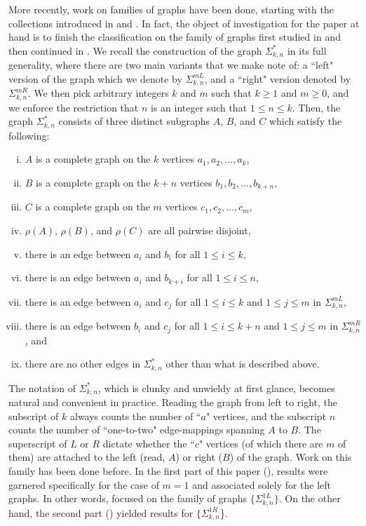 \documentclass[11pt]{amsart}
\theoremstyle{definition}
\theoremstyle{remark}
\numberwithin{equation}{section}
\newcommand{\SLR}[2]{\Sigma_{#1,#2}^*} %
\newcommand{\SLi}[3]{\Sigma_{#1,#2}^{#3L}} %
\newcommand{\SRi}[3]{\Sigma_{#1,#2}^{#3R}} %
\begin{document}
More recently, work on families of graphs have been done, starting with the collections introduced in \cite{BL} and \cite{BLL2}. In fact, the object of investigation for the paper at hand is to finish the classification on the family of graphs first studied in \cite{LM} and then continued in \cite{DLM}. We recall the construction of the graph $\SLR{k}{n}$ in its full generality, where there are two main variants that we make note of: a ``left" version of the graph which we denote by $\SLi{k}{n}{m}$, and a ``right" version denoted by $\SRi{k}{n}{m}$. We then pick arbitrary integers $k$ and $m$ such that $k\geq1$ and $m\geq0$, and we enforce the restriction that $n$ is an integer such that $1\leq n\leq k$. Then, the graph $\SLR{k}{n}$ consists of three distinct subgraphs $A$, $B$, and $C$ which satisfy the following:
\begin{enumerate}[(i)]
    \item $A$ is a complete graph on the $k$ vertices $a_1, a_2, \ldots, a_k$,
    \item $B$ is a complete graph on the $k+n$ vertices $b_1, b_2, \ldots, b_{k+n}$,
    \item $C$ is a complete graph on the $m$ vertices $c_1, c_2, \ldots, c_m$,
    \item $\rho(A)$, $\rho(B)$, and $\rho(C)$ are all pairwise disjoint,
    \item there is an edge between $a_i$ and $b_i$ for all $1\leq i\leq k$,
    \item there is an edge between $a_i$ and $b_{k+i}$ for all $1\leq i\leq n$,
    \item there is an edge between $a_i$ and $c_j$ for all $1\leq i\leq k$ and $1\leq j\leq m$ in $\SLi{k}{n}{m}$,
    \item there is an edge between $b_i$ and $c_j$ for all $1\leq i\leq k+n$ and $1\leq j\leq m$ in $\SRi{k}{n}{m}$, and
    \item there are no other edges in $\SLR{k}{n}$ other than what is described above.
\end{enumerate}

The notation of $\SLR{k}{n}$, which is clunky and unwieldy at first glance, becomes natural and convenient in practice. Reading the graph from left to right, the subscript of $k$ always counts the number of ``$a$" vertices, and the subscript $n$ counts the number of ``one-to-two" edge-mappings spanning $A$ to $B$. The superscript of $L$ or $R$ dictate whether the ``$c$" vertices (of which there are $m$ of them) are attached to the left (read, $A$) or right ($B$) of the graph. Work on this family has been done before. In the first part of this paper (\cite{LM}), results were garnered specifically for the case of $m=1$ and associated solely for the left graphs. In other words, \cite{LM} focused on the family of graphs $\{\SLi{k}{n}{1}\}$. On the other hand, the second part (\cite{DLM}) yielded results for $\{\SRi{k}{n}{1}$\}.
\end{document}

